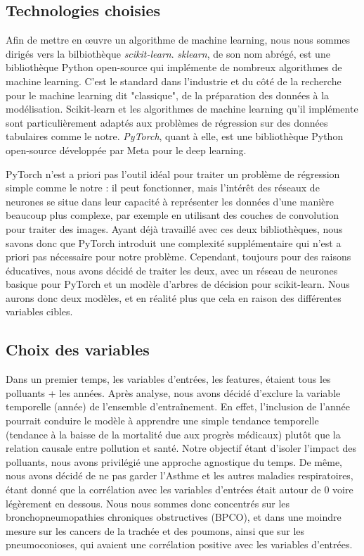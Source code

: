 \documentclass[11pt,a4paper]{article}
\begin{document}
\clearpage
\subsection{Technologies choisies}

Afin de mettre en œuvre un algorithme de machine learning, nous nous sommes dirigés vers la bilbiothèque \emph{scikit-learn}. \textit{sklearn}, de son nom abrégé, est une bibliothèque Python open-source qui implémente de nombreux algorithmes de machine learning. C'est le standard dans l'industrie et du côté de la recherche pour le machine learning dit "classique", de la préparation des données à la modélisation. Scikit-learn et les algorithmes de machine learning qu'il implémente sont particulièrement adaptés aux problèmes de régression sur des données tabulaires comme le notre. \emph{PyTorch}, quant à elle, est une bibliothèque Python open-source développée par Meta pour le deep learning.

PyTorch n'est a priori pas l'outil idéal pour traiter un problème de régression simple comme le notre : il peut fonctionner, mais l'intérêt des réseaux de neurones se situe dans leur capacité à représenter les données d'une manière beaucoup plus complexe, par exemple en utilisant des couches de convolution pour traiter des images. Ayant déjà travaillé avec ces deux bibliothèques, nous savons donc que PyTorch introduit une complexité supplémentaire qui n'est a priori pas nécessaire pour notre problème. Cependant, toujours pour des raisons éducatives, nous avons décidé de traiter les deux, avec un réseau de neurones basique pour PyTorch et un modèle d'arbres de décision pour scikit-learn. Nous aurons donc deux modèles, et en réalité plus que cela en raison des différentes variables cibles.

\subsection{Choix des variables}

Dans un premier temps, les variables d'entrées, les features, étaient tous les polluants + les années. Après analyse, nous avons décidé d'exclure la variable temporelle (année) de l'ensemble d'entraînement. En effet, l'inclusion de l'année pourrait conduire le modèle à apprendre une simple tendance temporelle (tendance à la baisse de la mortalité due aux progrès médicaux) plutôt que la relation causale entre pollution et santé. Notre objectif étant d'isoler l'impact des polluants, nous avons privilégié une approche agnostique du temps. De même, nous avons décidé de ne pas garder l'Asthme et les autres maladies respiratoires, étant donné que la corrélation avec les variables d'entrées était autour de 0 voire légèrement en dessous. Nous nous sommes donc concentrés sur les bronchopneumopathies chroniques obstructives (BPCO), et dans une moindre mesure sur les cancers de la trachée et des poumons, ainsi que sur les pneumoconioses, qui avaient une corrélation positive avec les variables d'entrées.
\end{document}
